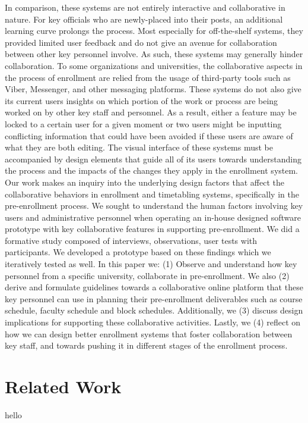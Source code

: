 In comparison, these systems are not entirely interactive and collaborative in nature. For key officials who are newly-placed into their posts, an additional learning curve prolongs the process. Most especially for off-the-shelf systems, they provided limited user feedback and do not give an avenue for collaboration between other key personnel involve. As such, these systems may generally hinder collaboration. To some organizations and universities, the collaborative aspects in the process of enrollment are relied from the usage of third-party tools such as Viber, Messenger, and other messaging platforms. These systems do not also give its current users insights on which portion of the work or process are being worked on by other key staff and personnel. As a result, either a feature may be locked to a certain user for a given moment or two users might be inputting conflicting information that could have been avoided if these users are aware of what they are both editing. The visual interface of these systems must be accompanied by design elements that guide all of its users towards understanding the process and the impacts of the changes they apply in the enrollment system. Our work makes an inquiry into the underlying design factors that affect the collaborative behaviors in enrollment and timetabling systems, specifically in the pre-enrollment process. We sought to understand the human factors involving key users and administrative personnel when operating an in-house designed software prototype with key collaborative features in supporting pre-enrollment. We did a formative study composed of interviews, observations, user tests with participants. We developed a prototype based on these findings which we iteratively tested as well. In this paper we: (1) Observe and understand how key personnel from a specific university, collaborate in pre-enrollment. We also (2) derive and formulate guidelines towards a collaborative online platform that these key personnel can use in planning their pre-enrollment deliverables such as course schedule, faculty schedule and block schedules. Additionally, we (3) discuss design implications for supporting these collaborative activities. Lastly, we (4) reflect on how we can design better enrollment systems that foster collaboration between key staff, and towards pushing it in different stages of the enrollment process. 

\section{Related Work}
hello

